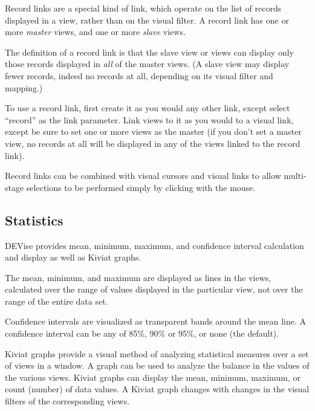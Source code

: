 Record links are a special kind of link, which operate on the list of records
displayed in a view, rather than on the visual filter.  A record link has
one or more {\em master} views, and one or more {\em slave} views.

The definition of a record link is that the slave view or views can display
only those records displayed in {\em all} of the master views.  (A slave view
may display fewer records, indeed no records at all, depending on its visual
filter and mapping.)

To use a record link, first create it as you would any other link, except
select ``record'' as the link parameter.  Link views to it as you would to
a visual link, except be sure to set one or more views as the master (if
you don't set a master view, no records at all will be displayed in any
of the views linked to the record link).

Record links can be combined with visual cursors and visual links to allow
multi-stage selections to be performed simply by clicking with the mouse.



\subsection{Statistics}

DEVise provides mean, minimum, maximum, and confidence interval calculation and
display as well as Kiviat graphs.

The mean, minimum, and maximum are displayed as lines in the views, calculated
over the range of values displayed in the particular view, not over the range of
the entire data set.

Confidence intervals are visualized as transparent bands around the mean line. A
confidence interval can be any of 85\%, 90\% or 95\%, or none (the default).

Kiviat graphs provide a visual method of analyzing statistical measures over a
set of views in a window. A graph can be used to analyze the balance in the
values of the various views. Kiviat graphs can display the mean, minimum,
maximum, or count (number) of data values. A Kiviat graph changes with changes
in the visual filters of the corresponding views.


